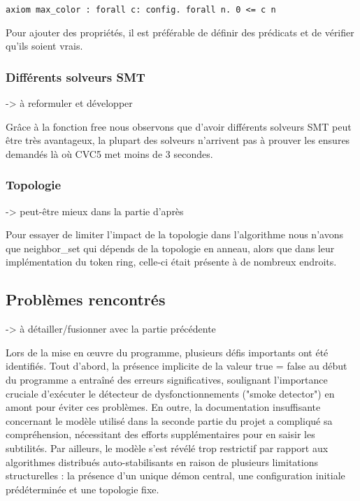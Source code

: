 \documentclass[11pt]{article}
\begin{document}
\lstset{language=why3,label= ,caption= ,captionpos=b,numbers=none}
\begin{lstlisting}
axiom max_color : forall c: config. forall n. 0 <= c n
\end{lstlisting}


Pour ajouter des propriétés, il est préférable de définir des prédicats et de vérifier qu'ils soient vrais. 

\subsubsection{Différents solveurs SMT}
\label{sec:orgd742311}

-> à reformuler et développer

Grâce à la fonction free nous observons que d'avoir différents solveurs SMT 
peut être très avantageux, la plupart des solveurs n'arrivent pas à prouver
les ensures demandés là où CVC5 met moins de 3 secondes.

\subsubsection{Topologie}
\label{sec:org5e64826}

-> peut-être mieux dans la partie d'après

Pour essayer de limiter l'impact de la topologie dans l'algorithme nous n'avons que 
neighbor\_set qui dépends de la topologie en anneau,
alors que dans leur implémentation du token ring, celle-ci était présente à de nombreux endroits.

\subsection{Problèmes rencontrés}
\label{sec:orga327759}

-> à détailler/fusionner avec la partie précédente

Lors de la mise en œuvre du programme, plusieurs défis importants ont été identifiés. 
Tout d'abord, la présence implicite de la valeur true = false au début du programme a entraîné des erreurs significatives, 
soulignant l'importance cruciale d'exécuter le détecteur de dysfonctionnements ("smoke detector") en amont pour éviter ces problèmes. 
En outre, la documentation insuffisante concernant le modèle utilisé dans la seconde partie du projet a compliqué sa compréhension, 
nécessitant des efforts supplémentaires pour en saisir les subtilités. 
Par ailleurs, le modèle s'est révélé trop restrictif par rapport aux algorithmes distribués auto-stabilisants en raison de plusieurs limitations structurelles : 
la présence d'un unique démon central, une configuration initiale prédéterminée et une topologie fixe. 
\end{document}
